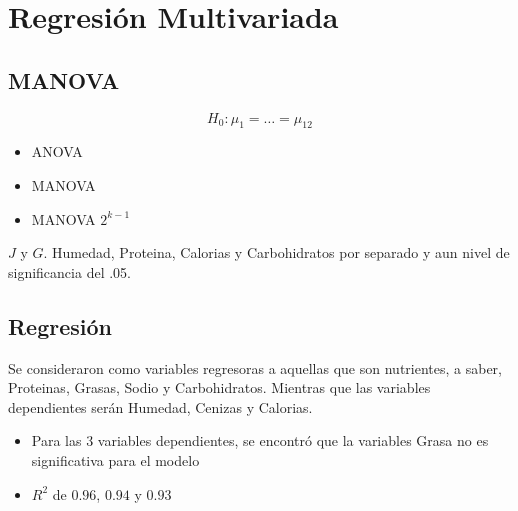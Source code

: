 \documentclass[pdf]{beamer}
\begin{document}
\begin{frame}
\end{frame}

\section{Regresión Multivariada}
\subsection{MANOVA}
\begin{frame}
$$H_0:\mu_1=\hdots=\mu_12$$

\end{frame}

\begin{frame}
\begin{itemize}
\item ANOVA
\item MANOVA
\item MANOVA $2^{k-1}$
\end{itemize}
\end{frame}

\begin{frame}
$J$ y $G$.  Humedad, Proteina, Calorias y Carbohidratos por separado y aun nivel de significancia del .05.
\end{frame}

\subsection{Regresión}
\begin{frame}
Se consideraron como variables regresoras a aquellas que son nutrientes, a saber, Proteinas, Grasas, Sodio y Carbohidratos. Mientras que las variables dependientes serán Humedad, Cenizas y Calorias.
\end{frame}

\begin{frame}
\begin{itemize}
\item Para las 3 variables dependientes, se encontró que la variables Grasa no es significativa para el modelo
\item $R^2$ de $0.96$, $0.94$ y $0.93$
\end{itemize}
\end{frame}
\end{document}
